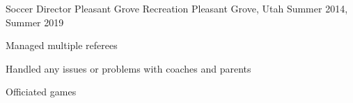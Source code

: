 \begin{cventries}
  \cventry
    {Soccer Director} %
    {Pleasant Grove Recreation} %
    {Pleasant Grove, Utah} %
    {Summer 2014, Summer 2019} %
    {
      \begin{cvitems} %
        \item {Managed multiple referees}
        \item {Handled any issues or problems with coaches and parents}
        \item {Officiated games}
      \end{cvitems}
    }

\end{cventries}
